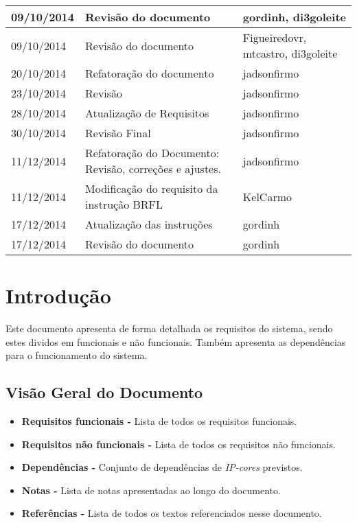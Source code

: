 \documentclass{article}
\begin{document}
\begin{table}[ht]
\begin{tabular}[pos]{|m{2cm} | m{7.2cm} | m{3.8cm}|}
      \small 09/10/2014 & \small Revisão do documento & \small gordinh, di3goleite \\ \hline
      \small 09/10/2014 & \small Revisão do documento & \small Figueiredovr, mtcastro, di3goleite \\ \hline
      \small 20/10/2014 & \small Refatoração do documento & \small jadsonfirmo \\ \hline
      \small 23/10/2014 & \small Revisão & \small jadsonfirmo \\ \hline
      \small 28/10/2014 & \small Atualização de Requisitos & \small jadsonfirmo \\ \hline
      \small 30/10/2014 & \small Revisão Final & \small jadsonfirmo \\ \hline
      \small 11/12/2014 & \small Refatoração do Documento: Revisão, correções e ajustes. & \small jadsonfirmo \\ \hline
      \small 11/12/2014 & \small Modificação do requisito da instrução BRFL & \small KelCarmo \\ \hline
      \small 17/12/2014 & \small Atualização das instruções & \small gordinh \\ \hline
      \small 17/12/2014 & \small Revisão do documento & \small gordinh \\ \hline
    \end{tabular}
  \end{table}

\newpage

\tableofcontents
\newpage

\section{Introdução}
	Este documento apresenta de forma detalhada os requisitos do sistema, sendo estes dividos em funcionais e não funcionais. Também apresenta as dependências para o funcionamento do sistema.

\subsection{Visão Geral do Documento}
  \begin{itemize}
   \item \textbf{Requisitos funcionais -} Lista de todos os requisitos funcionais.
   \item \textbf{Requisitos não funcionais -} Lista de todos os requisitos não funcionais.
   \item \textbf{Dependências -} Conjunto de dependências de \textit{IP-cores} previstos.
   \item \textbf{Notas -} Lista de notas apresentadas ao longo do documento.
   \item \textbf{Referências -} Lista de todos os textos referenciados nesse documento.
  \end{itemize}
\end{document}

